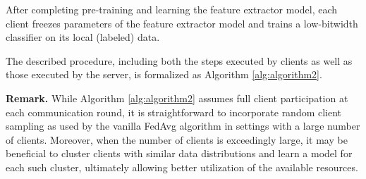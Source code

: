 After completing pre-training and learning the feature extractor model, each client freezes parameters of the feature extractor model and trains a low-bitwidth classifier on its local (labeled) data. 

The described procedure, including both the steps executed by clients as well as those executed by the server, is formalized as Algorithm \ref{alg:algorithm2}.

{\bf Remark.}
While Algorithm \ref{alg:algorithm2} assumes full client participation at each communication round, it is straightforward to incorporate random client sampling as used by the vanilla FedAvg algorithm in settings with a large number of clients. Moreover, when the number of clients is exceedingly large, it may be beneficial to cluster clients with similar data distributions and learn a model for each such cluster, ultimately allowing better utilization of the available resources.


